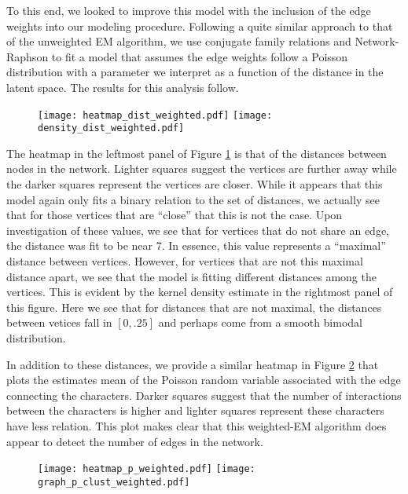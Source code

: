 \documentclass{article}
\begin{document}
To this end, we looked to improve this model with the inclusion of the edge weights into our modeling procedure. Following a quite similar approach to that of the unweighted EM algorithm, we use conjugate family relations and Network-Raphson to fit a model that assumes the edge weights follow a Poisson distribution with a parameter we interpret as a function of the distance in the latent space. The results for this analysis follow.
\begin{figure}[h!]
\centering
\texttt{[image: heatmap\_dist\_weighted.pdf]}
\texttt{[image: density\_dist\_weighted.pdf]}
\caption{}
\label{heatmap_weighted}
\end{figure}
The heatmap in the leftmost panel of Figure \ref{heatmap_weighted} is that of the distances between nodes in the network. Lighter squares suggest the vertices are further away while the darker squares represent the vertices are closer. While it appears that this model again only fits a binary relation to the set of distances, we actually see that for those vertices that are ``close'' that this is not the case. Upon investigation of these values, we see that for vertices that do not share an edge, the distance was fit to be near $7$. In essence, this value represents a ``maximal'' distance between vertices. However, for vertices that are not this maximal distance apart, we see that the model is fitting different distances among the vertices. This is evident by the kernel density estimate in the rightmost panel of this figure. Here we see that for distances that are not maximal, the distances between vetices fall in $[0,.25]$ and perhaps come from a smooth bimodal distribution.


In addition to these distances, we provide a similar heatmap in Figure \ref{weighted_clustering} that plots the estimates mean of the Poisson random variable associated with the edge connecting the characters. Darker squares suggest that the number of interactions between the characters is higher and lighter squares represent these characters have less relation. This plot makes clear that this weighted-EM algorithm does appear to detect the number of edges in the network. 


\begin{figure}[h!]
\centering
\texttt{[image: heatmap\_p\_weighted.pdf]}
\texttt{[image: graph\_p\_clust\_weighted.pdf]}
\caption{}
\label{weighted_clustering}
\end{figure}
\end{document}
